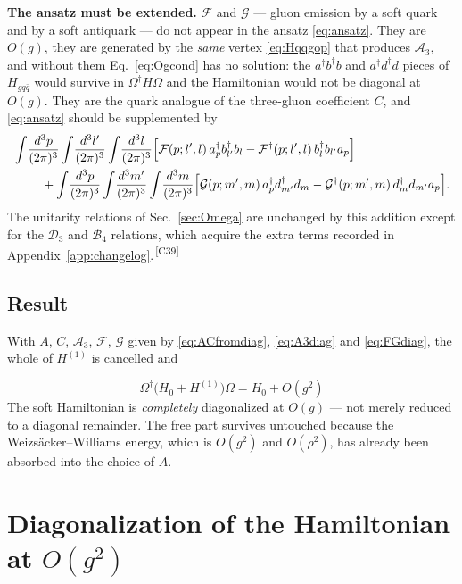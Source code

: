 \documentclass[11pt]{article}
\newcommand{\dg}{\dagger}
\newcommand{\ip}[1]{\int\!\frac{d^{3}#1}{(2\pi)^{3}}}
\newcommand{\OM}{\Omega}
\newcommand{\A}{\mathcal{A}}
\newcommand{\B}{\mathcal{B}}
\newcommand{\D}{\mathcal{D}}
\newcommand{\chg}[1]{{\color{blue!70!black}\textsuperscript{\,[C#1]}}}
\begin{document}
\begin{warn}
\textbf{The ansatz must be extended.} $\mathcal F$ and $\mathcal G$ --- gluon emission by a soft
quark and by a soft antiquark --- do not appear in the ansatz \eqref{eq:ansatz}. They are $O(g)$,
they are generated by the \emph{same} vertex \eqref{eq:Hqqgop} that produces $\A_{3}$, and
without them Eq.~\eqref{eq:Ogcond} has no solution: the $a^{\dg}b^{\dg}b$ and $a^{\dg}d^{\dg}d$
pieces of $H_{gq\bar q}$ would survive in $\OM^{\dg}H\OM$ and the Hamiltonian would not be
diagonal at $O(g)$. They are the quark analogue of the three-gluon coefficient $C$, and
\eqref{eq:ansatz} should be supplemented by
\begin{align}
&\ip{p}\ip{l'}\ip{l}\Big[\mathcal F(p;l',l)\,a^{\dg}_{p}b^{\dg}_{l'}b_{l}
-\mathcal F^{\dg}(p;l',l)\,b^{\dg}_{l}b_{l'}a_{p}\Big]
\nonumber\\
&\hspace{0.8cm}+\ip{p}\ip{m'}\ip{m}\Big[\mathcal G(p;m',m)\,a^{\dg}_{p}d^{\dg}_{m'}d_{m}
-\mathcal G^{\dg}(p;m',m)\,d^{\dg}_{m}d_{m'}a_{p}\Big].
\label{eq:FGansatz}
\end{align}
The unitarity relations of Sec.~\ref{sec:Omega} are unchanged by this addition except for the
$\D_{3}$ and $\B_{4}$ relations, which acquire the extra terms recorded in
Appendix~\ref{app:changelog}.\chg{39}
\end{warn}

\subsection{Result}

With $A$, $C$, $\A_{3}$, $\mathcal F$, $\mathcal G$ given by \eqref{eq:ACfromdiag},
\eqref{eq:A3diag} and \eqref{eq:FGdiag}, the whole of $H^{(1)}$ is cancelled and
\begin{res}
\begin{equation}
\boxed{\;\OM^{\dg}\big(H_{0}+H^{(1)}\big)\OM=H_{0}+O(g^{2})\;}
\label{eq:Ogresult}
\end{equation}
The soft Hamiltonian is \emph{completely} diagonalized at $O(g)$ --- not merely reduced to a
diagonal remainder. The free part survives untouched because the Weizs\"acker--Williams energy,
which is $O(g^{2})$ and $O(\rho^{2})$, has already been absorbed into the choice of $A$.
\end{res}

\section{Diagonalization of the Hamiltonian at $O(g^{2})$}
\label{sec:diagg2}
\end{document}
